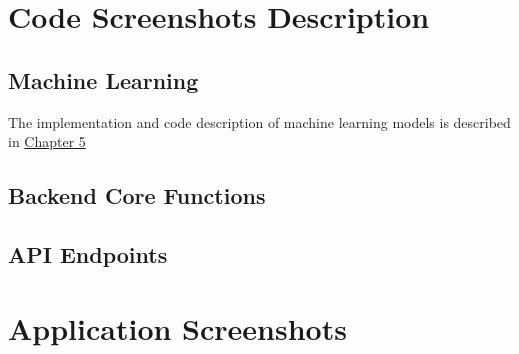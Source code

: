 \section{Code Screenshots Description}

\subsection{Machine Learning}
The implementation and code description of machine learning models is described in \hyperref[ch:modeling]{Chapter 5}

\subsection{Backend Core Functions}
	\subsection{API Endpoints}

\section{Application Screenshots}

